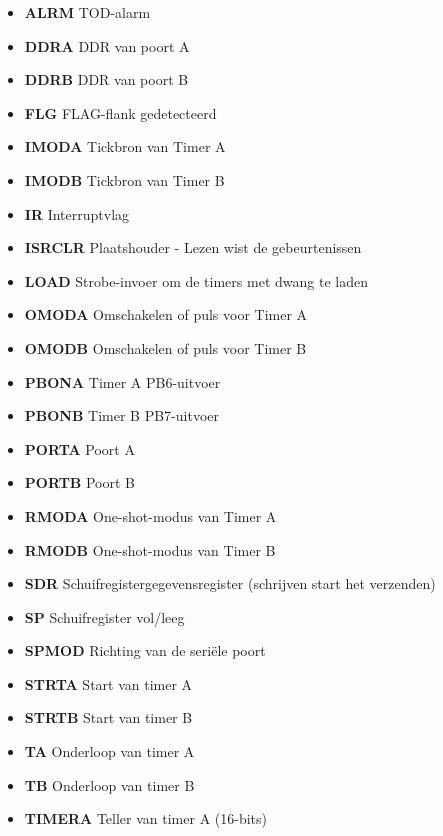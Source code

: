\begin{itemize}
\item{\bf{ALRM}} TOD-alarm
\item{\bf{DDRA}} DDR van poort A
\item{\bf{DDRB}} DDR van poort B
\item{\bf{FLG}} FLAG-flank gedetecteerd
\item{\bf{IMODA}} Tickbron van Timer A
\item{\bf{IMODB}} Tickbron van Timer B
\item{\bf{IR}} Interruptvlag
\item{\bf{ISRCLR}} Plaatshouder - Lezen wist de gebeurtenissen
\item{\bf{LOAD}} Strobe-invoer om de timers met dwang te laden
\item{\bf{OMODA}} Omschakelen of puls voor Timer A
\item{\bf{OMODB}} Omschakelen of puls voor Timer B
\item{\bf{PBONA}} Timer A PB6-uitvoer
\item{\bf{PBONB}} Timer B PB7-uitvoer
\item{\bf{PORTA}} Poort A
\item{\bf{PORTB}} Poort B
\item{\bf{RMODA}} One-shot-modus van Timer A
\item{\bf{RMODB}} One-shot-modus van Timer B
\item{\bf{SDR}} Schuifregistergegevensregister (schrijven start het verzenden)
\item{\bf{SP}} Schuifregister vol/leeg
\item{\bf{SPMOD}} Richting van de seriële poort
\item{\bf{STRTA}} Start van timer A
\item{\bf{STRTB}} Start van timer B
\item{\bf{TA}} Onderloop van timer A
\item{\bf{TB}} Onderloop van timer B
\item{\bf{TIMERA}} Teller van timer A (16-bits)

\end{itemize}
